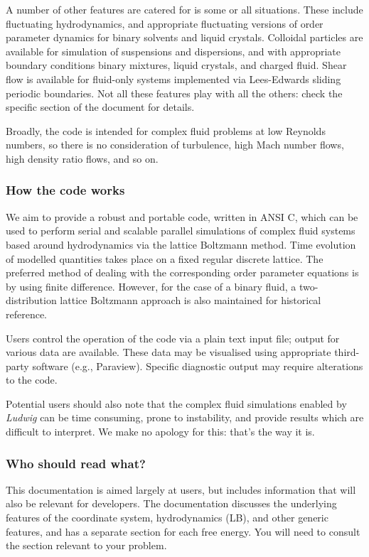 A number of other features are catered for is some or all situations.
These include fluctuating hydrodynamics, and appropriate fluctuating
versions of order parameter dynamics for binary solvents and liquid
crystals. Colloidal particles are available for simulation of
suspensions and dispersions, and with appropriate boundary
conditions binary mixtures, liquid crystals, and charged fluid. Shear
flow is available for fluid-only systems implemented via Lees-Edwards
sliding periodic boundaries. Not all these features play with all the
others: check the specific section of the document for details.

Broadly, the code is intended for complex fluid problems at low
Reynolds numbers, so there is no consideration of turbulence,
high Mach number flows, high density ratio flows, and so on.

\subsubsection{How the code works}

We aim to provide a robust and portable code, written in ANSI C, which
can be used to perform serial and scalable parallel simulations of
complex fluid systems based around hydrodynamics via the lattice
Boltzmann method. Time evolution of modelled quantities takes
place on a fixed regular discrete lattice. The preferred method of
dealing with the corresponding order parameter equations is by
using finite difference. However, for the case of a binary fluid,
a two-distribution lattice Boltzmann approach is also maintained
for historical reference.

Users control the operation of the code via a plain text input file;
output for various data are available. These data may be visualised
using appropriate third-party software (e.g., Paraview). Specific
diagnostic output may require alterations to the code.

Potential users should also note that the complex fluid simulations
enabled by \textit{Ludwig} can be time consuming, prone to instability,
and provide results which are difficult to
interpret. We make no apology for this: that's the way it is.

\subsubsection{Who should read what?}

This documentation is aimed largely at users, but includes information
that will also be relevant for developers. The documentation discusses
the underlying features of the coordinate system, hydrodynamics (LB), and
other generic features, and has a separate section for each free energy.
You will need to consult the section relevant to your problem.



